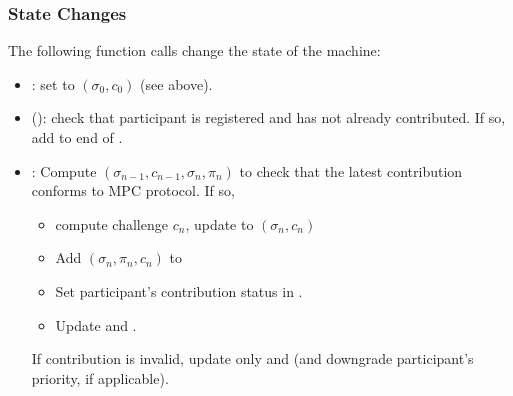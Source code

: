 \subsubsection*{State Changes}
The following function calls change the state of the machine:
\begin{itemize}
    \item \initialize{}: set \MpcState{} to $(\sigma_0, c_0)$ (see above).
    \item \enqueue{}(\ParticipantId{}): check that participant is registered and has not already contributed. If so, add to end of \Queue{}.
    \item \update{}: Compute \verify{}$(\sigma_{n-1}, c_{n-1}, \sigma_n, \pi_n)$ to check that the latest contribution conforms to MPC protocol. If so, 
        \begin{itemize}
            \item compute challenge $c_n$, update \MpcState{} to $(\sigma_n, c_n)$
            \item Add $(\sigma_n, \pi_n, c_n)$ to \Transcript{}
            \item Set participant's contribution status in \Registry. 
            \item Update \Queue{} and \TimedLock{}.
        \end{itemize}
        If contribution is invalid, update only \Queue{} and \TimedLock{} (and downgrade participant's \Queue{} priority, if applicable).
\end{itemize}

